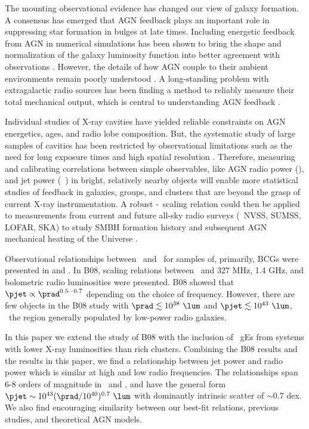 \documentclass{emulateapj}
\begin{document}
The mounting observational evidence has changed our view of galaxy
formation. A consensus has emerged that AGN feedback plays an
important role in suppressing star formation in bulges at late
times. Including energetic feedback from AGN in numerical simulations
has been shown to bring the shape and normalization of the galaxy
luminosity function into better agreement with observations
\citep{croton06, bower06, saro06, sijacki07}. However, the details of
how AGN couple to their ambient environments remain poorly understood
\citep{2008ASPC..386..343D, 2009arXiv0910.3691M}.  A long-standing
problem with extragalactic radio sources has been finding a method to
reliably measure their total mechanical output, which is central to
understanding AGN feedback \citep[\eg][]{1991Natur.349..138R,
  1996AJ....112....9L}.

Individual studies of X-ray cavities have yielded reliable constraints
on AGN energetics, ages, and radio lobe composition. But, the
systematic study of large samples of cavities has been restricted by
observational limitations such as the need for long exposure times and
high spatial resolution \citep{2009arXiv0909.0397B}. Therefore,
measuring and calibrating correlations between simple observables,
like AGN radio power (\prad), and jet power (\eg\ \pjet) in bright,
relatively nearby objects will enable more statistical studies of
feedback in galaxies, groups, and clusters that are beyond the grasp
of current X-ray instrumentation. A robust \pjet-\prad\ scaling
relation could then be applied to measurements from current and future
all-sky radio surveys (\eg\ NVSS, SUMSS, LOFAR, SKA) to study SMBH
formation history and subsequent AGN mechanical heating of the
Universe \citep{croton06, 2006MNRAS.366..397S}.

Observational relationships between \pjet\ and \prad\ for samples of,
primarily, BCGs were presented in \citet[][hereafter B04]{birzan04}
and \citet[][hereafter B08]{birzan08}. In B08, scaling relations
between \pjet\ and 327 MHz, 1.4 GHz, and bolometric radio luminosities
were presented. B08 showed that $\pjet \propto \prad^{0.5-0.7}$
depending on the choice of frequency. However, there are few objects
in the B08 study with $\prad \lesssim 10^{38} ~\lum$ and $\pjet
\lesssim 10^{43} ~\lum$, \ie\ the region generally populated by
low-power radio galaxies.

In this paper we extend the study of B08 with the inclusion of
\samp\ gEs from systems with lower X-ray luminosities than rich
clusters. Combining the B08 results and the results in this paper, we
find a relationship between jet power and radio power which is similar
at high and low radio frequencies. The relationships span 6-8 orders
of magnitude in \pjet\ and \prad, and have the general form $\pjet
\sim 10^{43} (\prad/10^{40})^{0.7} ~\lum$ with dominantly intrinsic
scatter of $\sim 0.7$ dex. We also find encouraging similarity between
our best-fit relations, previous studies, and theoretical AGN models.
\end{document}
